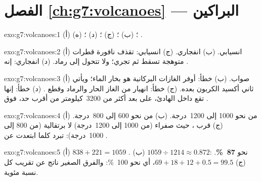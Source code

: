 \section*{الفصل \ref{ch:g7:volcanoes} --- البراكين}

\begin{solution}{exo:g7:volcanoes:1}
(أ) ؛ (ب) ؛ (ج) ؛ (د) ؛ (ه) .
\end{solution}

\begin{solution}{exo:g7:volcanoes:2}
(أ) انسيابي. (ب) انفجاري. (ج) انسيابي: تقذف نافورة 
قطرات متوهجة تسقط ثم تجري؛ ولا تتحول  إلى رماد.
(د) انفجاري: إنه .
\end{solution}

\begin{solution}{exo:g7:volcanoes:3}
(أ) صواب. (ب) خطأ: أوفر الغازات البركانية هو بخار الماء؛
ويأتي ثاني أكسيد الكربون بعده. (ج) خطأ:  انهيار
من الغاز الحار والرماد وقطع . (د) خطأ: إنها تقع داخل
  الهادئ، على بعد أكثر من 3200~كيلومتر من أقرب حد، فوق
.
\end{solution}

\begin{solution}{exo:g7:volcanoes:4}
(أ) من نحو 1000 إلى 1200~درجة. (ب) من نحو 600 إلى 800~درجة. (ج) قرب
، حيث  صفراء (من 1000 إلى 1200~درجة) لا برتقالية
(من 800 إلى 1000~درجة):  تبرد كلما ابتعدت عن .
\end{solution}

\begin{solution}{exo:g7:volcanoes:5}
(أ) $838 + 221 = 1059$ . (ب) $1059 \div 1214 \approx 0.872$:
نحو \textbf{87~\%}. (ج) $69 + 18 + 12 + 0.5 = 99.5$، أي نحو 100~\%:
والفرق الصغير ناتج عن تقريب كل نسبة مئوية.
\end{solution}

